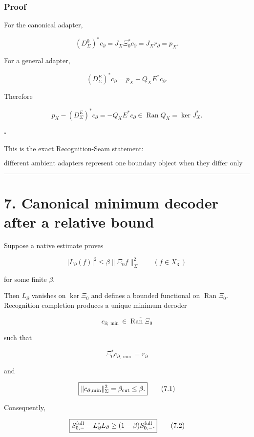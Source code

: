 \hypertarget{proof-2}{%
\subsubsection{Proof}\label{proof-2}}

For the canonical adapter,

\[
(D_\Sigma^0)^*c_\partial
=
J_X\Xi_0^*c_\partial
=
J_Xr_\partial
=
p_X.
\]

For a general adapter,

\[
(D_\Sigma^E)^*c_\partial
=
p_X+Q_XE^*c_\partial.
\]

Therefore

\[
p_X-(D_\Sigma^E)^*c_\partial
=
-Q_XE^*c_\partial
\in\operatorname{Ran}Q_X
=
\ker J_X^*.
\]

\(\square\)

This is the exact Recognition-Seam statement:

\[
\boxed{
\text{different ambient adapters represent one boundary object
when they differ only by graph-null memory.}
}
\]

\begin{center}\rule{0.5\linewidth}{0.5pt}\end{center}

\hypertarget{canonical-minimum-decoder-after-a-relative-bound}{%
\section{7. Canonical minimum decoder after a relative bound}\label{canonical-minimum-decoder-after-a-relative-bound}}

Suppose a native estimate proves

\[
|L_\partial(f)|^2
\le
\beta\|\Xi_0f\|_\Sigma^2
\qquad(f\in X_3^-)
\]

for some finite \(\beta\).

Then \(L_\partial\) vanishes on \(\ker\Xi_0\) and defines a bounded functional
on \(\operatorname{Ran}\Xi_0\). Recognition completion produces a unique
minimum decoder

\[
c_{\partial,\min}
\in\overline{\operatorname{Ran}\Xi_0}
\]

such that

\[
\Xi_0^*c_{\partial,\min}=r_\partial
\]

and

\[
\boxed{
\|c_{\partial,\min}\|_\Sigma^2
=
\beta_{\rm cut}
\le\beta.
}
\tag{7.1}
\]

Consequently,

\[
\boxed{
S_{0,-}^{\rm full}
-
L_\partial^*L_\partial
\ge
(1-\beta)
S_{0,-}^{\rm full}.
}
\tag{7.2}
\]

